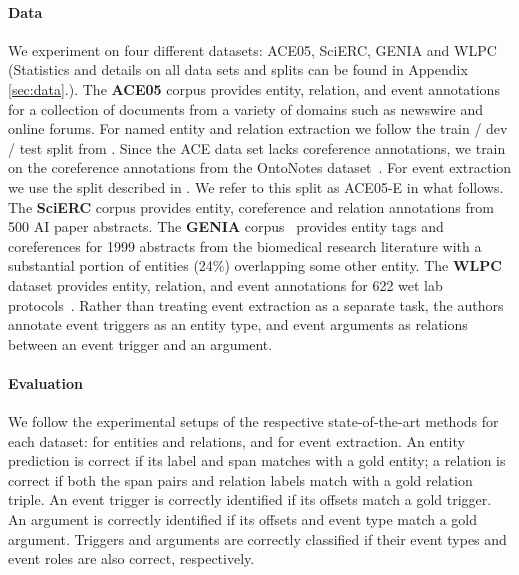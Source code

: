 \documentclass[11pt,a4paper]{article}
\begin{document}
\paragraph{Data}
We experiment on four different datasets: ACE05, SciERC, GENIA and WLPC (Statistics and details on all data sets and splits can be found in Appendix \ref{sec:data}.). The \textbf{ACE05}  corpus provides entity, relation, and event annotations for a collection of documents from a variety of domains such as newswire and online forums. For named entity and relation extraction we follow the train / dev / test split from . Since the ACE data set lacks coreference annotations, we train on the coreference annotations from the  OntoNotes dataset~\cite{pradhan2012conll}. For event extraction we use the split described in . 
We refer to this split as ACE05-E in what follows. The \textbf{SciERC} corpus \cite{luan2018multi} provides entity, coreference and relation annotations from 500 AI paper abstracts. The \textbf{GENIA} corpus~\cite{Kim2003GENIAC} provides entity tags and coreferences for 1999 abstracts from the biomedical research literature with a substantial portion of entities (24\%) overlapping some other entity. The \textbf{WLPC} dataset provides entity, relation, and event annotations for 622 wet lab protocols~\cite{Kulkarni2018AnAC}. Rather than treating event extraction as a separate task, the authors annotate event triggers as an entity type, and event arguments as relations between an event trigger and an argument. 

\vspace{-.2cm}

\paragraph{Evaluation} We follow the experimental setups of the respective state-of-the-art methods for each dataset:  for entities and relations, and  for event extraction. 
An entity prediction is correct if its label and span matches with a gold entity; a relation is correct if both the span pairs and relation labels match with a gold relation triple. An event trigger is correctly identified if its offsets match a gold trigger. An argument is correctly identified if its offsets and event type match a gold argument. Triggers and arguments are correctly classified if their event types and event roles are also correct, respectively. 
\end{document}
